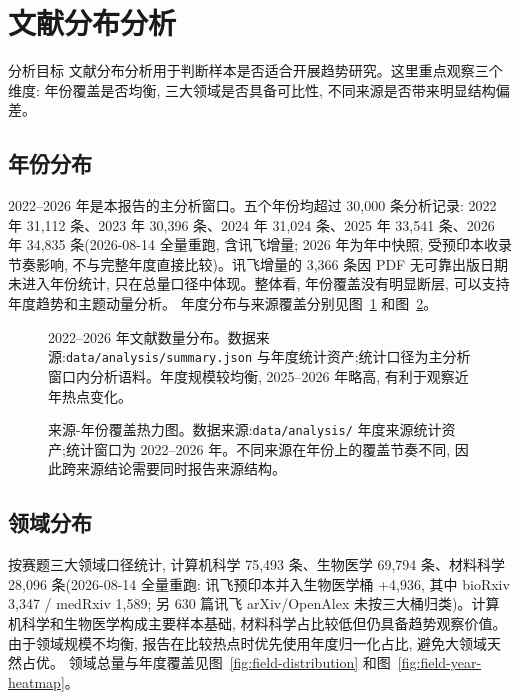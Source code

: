\section{文献分布分析}

\begin{reportbox}{分析目标}
文献分布分析用于判断样本是否适合开展趋势研究。这里重点观察三个维度: 年份覆盖是否均衡, 三大领域是否具备可比性, 不同来源是否带来明显结构偏差。
\end{reportbox}

\subsection{年份分布}

2022--2026 年是本报告的主分析窗口。五个年份均超过 30,000 条分析记录: 2022 年 31,112 条、2023 年 30,396 条、2024 年 31,024 条、2025 年 33,541 条、2026 年 34,835 条(2026-08-14 全量重跑, 含讯飞增量; 2026 年为年中快照, 受预印本收录节奏影响, 不与完整年度直接比较)。讯飞增量的 3,366 条因 PDF 无可靠出版日期未进入年份统计, 只在总量口径中体现。整体看, 年份覆盖没有明显断层, 可以支持年度趋势和主题动量分析。
年度分布与来源覆盖分别见图~\ref{fig:year-distribution} 和图~\ref{fig:source-year-heatmap}。

\begin{figure}[!htbp]
  \centering
  \caption{2022--2026 年文献数量分布。数据来源:\texttt{data/analysis/summary.json} 与年度统计资产;统计口径为主分析窗口内分析语料。年度规模较均衡, 2025--2026 年略高, 有利于观察近年热点变化。}
  \label{fig:year-distribution}
\end{figure}

\begin{figure}[!htbp]
  \centering
  \caption{来源-年份覆盖热力图。数据来源:\texttt{data/analysis/} 年度来源统计资产;统计窗口为 2022--2026 年。不同来源在年份上的覆盖节奏不同, 因此跨来源结论需要同时报告来源结构。}
  \label{fig:source-year-heatmap}
\end{figure}

\subsection{领域分布}

按赛题三大领域口径统计, 计算机科学 75,493 条、生物医学 69,794 条、材料科学 28,096 条(2026-08-14 全量重跑: 讯飞预印本并入生物医学桶 +4,936, 其中 bioRxiv 3,347 / medRxiv 1,589; 另 630 篇讯飞 arXiv/OpenAlex 未按三大桶归类)。计算机科学和生物医学构成主要样本基础, 材料科学占比较低但仍具备趋势观察价值。由于领域规模不均衡, 报告在比较热点时优先使用年度归一化占比, 避免大领域天然占优。
领域总量与年度覆盖见图~\ref{fig:field-distribution} 和图~\ref{fig:field-year-heatmap}。

